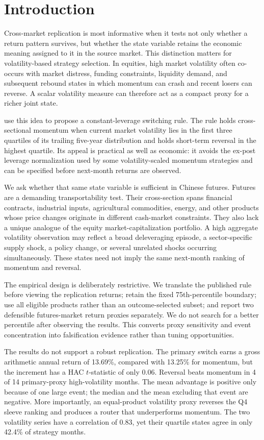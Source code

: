 \section{Introduction}

Cross-market replication is most informative when it tests not only whether a return
pattern survives, but whether the state variable retains the economic meaning assigned
to it in the source market. This distinction matters for volatility-based strategy
selection. In equities, high market volatility often co-occurs with market distress,
funding constraints, liquidity demand, and subsequent rebound states in which momentum
can crash and recent losers can reverse. A scalar volatility measure can therefore act
as a compact proxy for a richer joint state.

\citet{butt2023} use this idea to propose a constant-leverage switching rule. The rule
holds cross-sectional momentum when current market volatility lies in the first three
quartiles of its trailing five-year distribution and holds short-term reversal in the
highest quartile. Its appeal is practical as well as economic: it avoids the ex-post
leverage normalization used by some volatility-scaled momentum strategies and can be
specified before next-month returns are observed.

We ask whether that same state variable is sufficient in Chinese futures. Futures are a
demanding transportability test. Their cross-section spans financial contracts,
industrial inputs, agricultural commodities, energy, and other products whose price
changes originate in different cash-market constraints. They also lack a unique analogue
of the equity market-capitalization portfolio. A high aggregate volatility observation
may reflect a broad deleveraging episode, a sector-specific supply shock, a policy change,
or several unrelated shocks occurring simultaneously. These states need not imply the
same next-month ranking of momentum and reversal.

The empirical design is deliberately restrictive. We translate the published rule before
viewing the replication returns; retain the fixed 75th-percentile boundary; use all
eligible products rather than an outcome-selected subset; and report two defensible
futures-market return proxies separately. We do not search for a better percentile after
observing the results. This converts proxy sensitivity and event concentration into
falsification evidence rather than tuning opportunities.

The results do not support a robust replication. The primary switch earns a gross
arithmetic annual return of 13.69\%, compared with 13.25\% for momentum, but the
increment has a HAC $t$-statistic of only 0.06. Reversal beats momentum in 4 of 14
primary-proxy high-volatility months. The mean advantage is positive only because of one
large event; the median and the mean excluding that event are negative. More importantly,
an equal-product volatility proxy reverses the Q4 sleeve ranking and produces a router
that underperforms momentum. The two volatility series have a correlation of 0.83, yet
their quartile states agree in only 42.4\% of strategy months.

